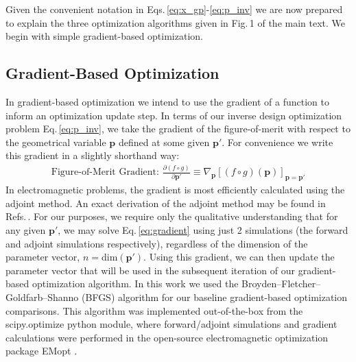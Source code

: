 \documentclass{article}
\begin{document}
Given the convenient notation in Eqs.\,\eqref{eq:x_gp}-\eqref{eq:p_inv}%
we are now prepared to explain the three optimization algorithms given in Fig.\,1 of the main text. We begin with simple gradient-based optimization.

\subsection{Gradient-Based Optimization}
In gradient-based optimization we intend to use the gradient of a function to inform an optimization update step. In terms of our inverse design optimization problem Eq.\,\eqref{eq:p_inv}, we take the gradient of the figure-of-merit with respect to the geometrical variable $\mathbf{p}$ defined at some given $\mathbf{p}'$. For convenience we write this gradient in a slightly shorthand way:
\begin{align}
    \text{Figure-of-Merit Gradient: }\frac{\partial(f\circ g)}{\partial \mathbf{p}'} \equiv \nabla_{\mathbf{p}} \left[(f\circ g)(\mathbf{p})\right]_{\mathbf{p}=\mathbf{p}'}\label{eq:gradient}
\end{align}
In electromagnetic problems, the gradient is most efficiently calculated using the adjoint method. An exact derivation of the adjoint method may be found in Refs.\,\cite{michaels_inverse_2018, su_fully-automated_2017, hooten_adjoint_2020, sun_adjoint-method-inspired_2020, dezfouli_design_2021}. For our purposes, we require only the qualitative understanding that for any given $\mathbf{p}'$, we may solve Eq.\,\eqref{eq:gradient} using just 2 simulations (the forward and adjoint simulations respectively), regardless of the dimension of the parameter vector, $n=\text{dim}(\mathbf{p}')$. Using this gradient, we can then update the parameter vector that will be used in the subsequent iteration of our gradient-based optimization algorithm. In this work we used the Broyden–Fletcher–Goldfarb–Shanno (BFGS) algorithm for our baseline gradient-based optimization comparisons. This algorithm was implemented out-of-the-box from the scipy.optimize python module, where forward/adjoint simulations and gradient calculations were performed in the open-source electromagnetic optimization package EMopt \cite{michaels_emopt_2019}.
\end{document}
